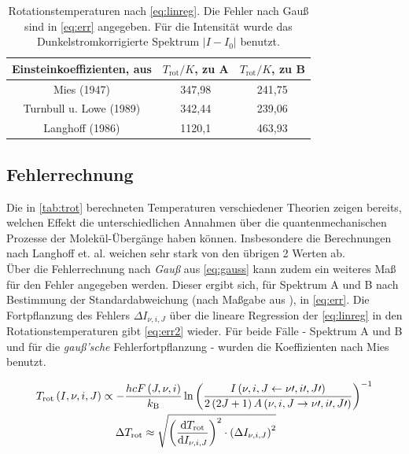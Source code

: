 \documentclass[numbers=noenddot,a4paper,notitlepage,twoside,BCOR15mm]{scrartcl}
\newcommand{\diff}{\textnormal{d}}
\newcommand{\ix}[1]{_\text{#1}}
\newcommand{\tilt}[1]{\textit{#1}}
\begin{document}
	\begin{table}[h]
		\centering
		\begin{tabular}{c|c|c}
			Einsteinkoeffizienten, aus \cite{EMAUGreifswaldOHRot} & $T\ix{rot}/\unit{K}$, zu A & $T\ix{rot}/\unit{K}$, zu B\\
			\hline Mies (1947) & 347,98 & 241,75 \\
			\hline Turnbull u. Lowe (1989) & 342,44 & 239,06 \\
			\hline Langhoff (1986) & 1120,1 & 463,93
		\end{tabular}
		\caption{Rotationstemperaturen nach \autoref{eq:linreg}. Die Fehler nach Gauß sind in \autoref{eq:err} angegeben. Für die Intensität wurde das Dunkelstromkorrigierte Spektrum $|I-I\ix{0}|$ benutzt.}
		\label{tab:trot}
	\end{table}
	
	\subsection{Fehlerrechnung}
	
	
	Die in \autoref{tab:trot} berechneten Temperaturen verschiedener Theorien zeigen bereits, welchen Effekt die unterschiedlichen Annahmen über die quantenmechanischen Prozesse der Molekül-Übergänge haben können. Insbesondere die Berechnungen nach Langhoff et. al. weichen sehr stark von den übrigen 2 Werten ab.\\
	Über die Fehlerrechnung nach \tilt{Gauß} aus \autoref{eq:gauss} kann zudem ein weiteres Maß für den Fehler angegeben werden. Dieser ergibt sich, für Spektrum A und B nach Bestimmung der Standardabweichung (nach Maßgabe aus \cite{EMAUGreifswaldOHRotat}), in \autoref{eq:err}. Die Fortpflanzung des Fehlers $\Delta I_{\nu,i,J}$ über die lineare Regression der \autoref{eq:linreg} in den Rotationstemperaturen gibt \autoref{eq:err2} wieder. Für beide Fälle - Spektrum A und B und für die \tilt{gauß'sche} Fehlerfortpflanzung - wurden die Koeffizienten nach Mies benutzt.
	
	\begin{align}
	T\ix{rot}\left(I,\nu,i,J\right)\propto-&\frac{hcF\left(J,\nu,i\right)}{k\ix{B}}\ln\left(\frac{I\left(\nu,i,J\leftarrow\nu\prime,i\prime,J\prime\right)}{2\left(2J+1\right)A\left(\nu,i,J\rightarrow\nu\prime,i\prime,J\prime\right)}\right)^{-1} \\
	\Delta& T\ix{rot}\approx\sqrt{\left(\frac{\diff T\ix{rot}}{\diff I_{\nu,i,J}}\right)^2\cdot\left(\Delta I_{\nu,i,J}\right)^2} \label{eq:gauss}
	\end{align}
	
\end{document}
